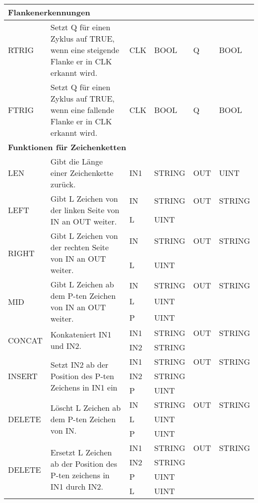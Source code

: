 {\begin{table}
\begin{tabular}{|m{2cm}|m{7cm}|>{\raggedright}m{0.5cm} >{\raggedleft}m{1.25cm}|>{\raggedright}m{0.5cm} >{\raggedleft\arraybackslash}m{1.25cm}|}
\multicolumn{6}{|l|}{\textbf{Flankenerkennungen}}\\
\hline
RTRIG & Setzt Q für einen Zyklus auf TRUE, wenn eine steigende Flanke er in CLK erkannt wird. & CLK & BOOL & Q & BOOL\\
\hline
FTRIG & Setzt Q für einen Zyklus auf TRUE, wenn eine fallende Flanke er in CLK erkannt wird. & CLK & BOOL & Q & BOOL\\
\hline
\multicolumn{6}{|l|}{\textbf{Funktionen für Zeichenketten}}\\
\hline
LEN & Gibt die Länge einer Zeichenkette zurück. & IN1 & STRING & OUT & UINT\\
\hline
\multirow{2}{*}{LEFT}&\multirow{2}{7cm}{Gibt L Zeichen von der linken Seite von IN an OUT weiter.}& IN & STRING & OUT & STRING\\
 & & L & UINT & &\\
\hline
\multirow{2}{*}{RIGHT}&\multirow{2}{7cm}{Gibt L Zeichen von der rechten Seite von IN an OUT weiter.}& IN & STRING & OUT & STRING\\
 & & L & UINT & &\\
\hline
\multirow{3}{*}{MID}&\multirow{3}{7cm}{Gibt L Zeichen ab dem P-ten Zeichen von IN an OUT weiter.}& IN & STRING & OUT & STRING\\
 & & L & UINT & &\\
 & & P & UINT & &\\
\hline
\multirow{2}{*}{CONCAT}&\multirow{2}{7cm}{Konkateniert IN1 und IN2.}& IN1 & STRING & OUT & STRING\\
 & & IN2 & STRING & &\\
\hline
\multirow{3}{*}{INSERT}&\multirow{3}{7cm}{Setzt IN2 ab der Position des P-ten Zeichens in IN1 ein}& IN1 & STRING & OUT & STRING\\
 & & IN2 & STRING & &\\
 & & P & UINT & &\\
\hline
\multirow{3}{*}{DELETE}&\multirow{3}{7cm}{Löscht L Zeichen ab dem P-ten Zeichen von IN.}& IN & STRING & OUT & STRING\\
 & & L & UINT & &\\
 & & P & UINT & &\\
\hline
\multirow{4}{*}{DELETE}&\multirow{4}{7cm}{Ersetzt L Zeichen ab der Position des P-ten zeichens in IN1 durch IN2.}& IN1 & STRING & OUT & STRING\\
 & & IN2 & STRING & &\\
 & & P & UINT & &\\
 & & L & UINT & &\\

\end{tabular}
\end{table}}
